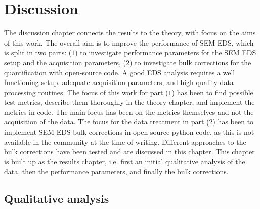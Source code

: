 %
\chapter{Discussion}
\label{ch:discussion}

The discussion chapter connects the results to the theory, with focus on the aims of this work.
The overall aim is to improve the performance of SEM EDS, which is split in two parts:
($1$) to investigate performance parameters for the SEM EDS setup and the acquisition parameters, ($2$) to investigate bulk corrections for the quantification with open-source code.
A good EDS analysis requires a well functioning setup, adequate acquisition parameters, and high quality data processing routines.
The focus of this work for part ($1$) has been to find possible test metrics, describe them thoroughly in the theory chapter, and implement the metrics in code.
The main focus has been on the metrics themselves and not the acquisition of the data.
The focus for the data treatment in part ($2$) has been to implement SEM EDS bulk corrections in open-source python code, as this is not available in the community at the time of writing.
Different approaches to the bulk corrections have been tested and are discussed in this chapter.
This chapter is built up as the results chapter, i.e. first an initial qualitative analysis of the data, then the performance parameters, and finally the bulk corrections.











\section{Qualitative analysis}
\label{discussion:qualitative_analysis}


